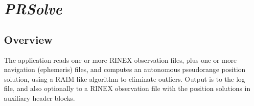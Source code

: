 %
%

\section{\emph{PRSolve}}
\subsection{Overview}
The application reads one or more RINEX observation files, plus one or more
   navigation (ephemeris) files, and computes an autonomous pseudorange
   position solution, using a RAIM-like algorithm to eliminate outliers.
   Output is to the log file, and also optionally to a RINEX observation file with
   the position solutions in auxiliary header blocks.

